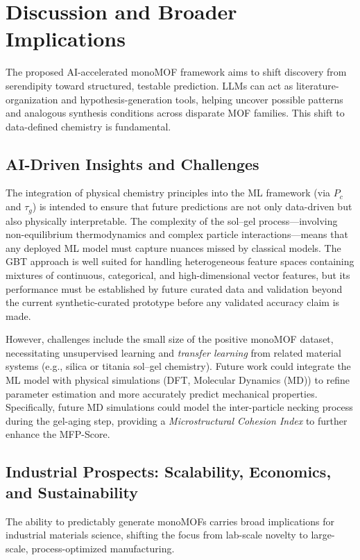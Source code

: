 \documentclass[12pt,a4paper]{article}
\begin{document}
\section{Discussion and Broader Implications}

The proposed AI-accelerated monoMOF framework aims to shift discovery from serendipity toward structured, testable prediction. LLMs can act as literature-organization and hypothesis-generation tools, helping uncover possible patterns and analogous synthesis conditions across disparate MOF families. This shift to data-defined chemistry is fundamental.

\subsection{AI-Driven Insights and Challenges}

The integration of physical chemistry principles into the ML framework (via $P_c$ and $\tau_g$) is intended to ensure that future predictions are not only data-driven but also physically interpretable. The complexity of the sol–gel process—involving non-equilibrium thermodynamics and complex particle interactions—means that any deployed ML model must capture nuances missed by classical models. The GBT approach is well suited for handling heterogeneous feature spaces containing mixtures of continuous, categorical, and high-dimensional vector features, but its performance must be established by future curated data and validation beyond the current synthetic-curated prototype before any validated accuracy claim is made.

However, challenges include the small size of the positive monoMOF dataset, necessitating unsupervised learning and \textit{transfer learning} from related material systems (e.g., silica or titania sol–gel chemistry). Future work could integrate the ML model with physical simulations (DFT, Molecular Dynamics (MD)) to refine parameter estimation and more accurately predict mechanical properties. Specifically, future MD simulations could model the inter-particle necking process during the gel-aging step, providing a \textit{Microstructural Cohesion Index} to further enhance the MFP-Score.

\subsection{Industrial Prospects: Scalability, Economics, and Sustainability}

The ability to predictably generate monoMOFs carries broad implications for industrial materials science, shifting the focus from lab-scale novelty to large-scale, process-optimized manufacturing.\cite{ref39}
\end{document}
